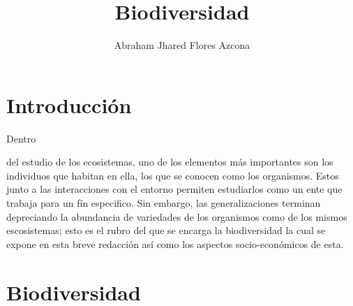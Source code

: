 \documentclass[stu, 12pt, letterpaper, donotrepeattitle, floatsintext, natbib]{apa7}
\title{\Large Biodiversidad}
\author{Abraham Jhared Flores Azcona} %
\affiliation{Instituto Tecnológico de Tijuana}
\begin{document}
\maketitle


\renewcommand\contentsname{Contenido}
\tableofcontents

\newpage
\section*{Introducción}
Dentro \begin{justifying}
    del estudio de los ecosistemas, uno de los elementos más importantes son los individuos que habitan en ella, los que se conocen como los organismos.
    Estos junto a las interacciones con el entorno permiten estudiarlos como un ente que trabaja para un fín especifico. Sin embargo, las generalizaciones
    terminan depreciando la abundancia de variedades de los organismos como de los mismos escosistemas; esto es el rubro del que se encarga la biodiversidad la cual
    se expone en esta breve redacción así como los aspectos socio-económicos de esta.\par
\end{justifying}
\section{Biodiversidad}
\end{document}
